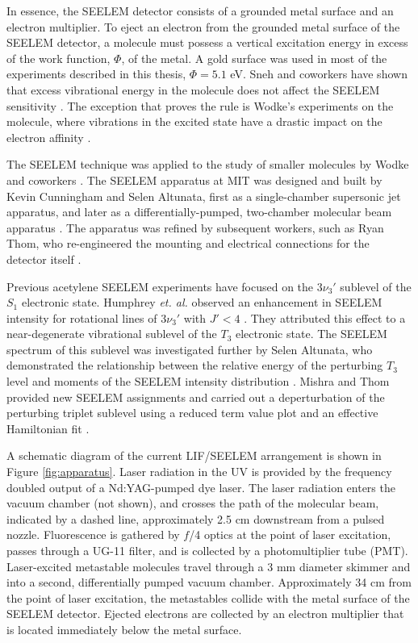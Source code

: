 In essence, the SEELEM detector consists of a grounded metal surface
and an electron multiplier.  To eject an electron from the grounded
metal surface of the SEELEM detector, a molecule must possess a
vertical excitation energy in excess of the work function, $\Phi$, of
the metal.  A gold surface was used in most of the experiments
described in this thesis, $\Phi = 5.1$ eV.  Sneh and coworkers have
shown that excess vibrational energy in the molecule does not affect
the SEELEM sensitivity \cite{sneh86}.  The exception that proves the
rule is Wodke's experiments on the  molecule, where vibrations
in the excited state have a drastic impact on the electron affinity
\cite{white05}.

The SEELEM technique was applied to the study of smaller molecules by
Wodke and coworkers \cite{price92, drabbels95, morgan96, humphrey97}.
The SEELEM apparatus at MIT was designed and built by Kevin Cunningham
and Selen Altunata, first as a single-chamber supersonic jet
apparatus, and later as a differentially-pumped, two-chamber molecular
beam apparatus \cite{cunningham-thesis, altunata-thesis}.  The
apparatus was refined by subsequent workers, such as Ryan Thom, who
re-engineered the mounting and electrical connections for the detector
itself \cite{thom-thesis}.

Previous acetylene SEELEM experiments have focused on the $3\nu_3'$
 sublevel of the $S_1$ electronic state.  Humphrey \emph{et.
  al.} observed an enhancement in SEELEM intensity for rotational
lines of $3\nu_3'$  with $J' < 4$ \cite{humphrey97}.  They
attributed this effect to a near-degenerate vibrational sublevel of
the $T_3$ electronic state.  The SEELEM spectrum of this sublevel was
investigated further by Selen Altunata, who demonstrated the
relationship between the relative energy of the perturbing $T_3$ level
and moments of the SEELEM intensity distribution \cite{altunata00}.
Mishra and Thom provided new SEELEM assignments and carried out a
deperturbation of the perturbing triplet sublevel using a reduced term
value plot and an effective Hamiltonian fit \cite{mishra04}.

A schematic diagram of the current LIF/SEELEM arrangement is shown in
Figure \ref{fig:apparatus}.  Laser radiation in the UV is provided by
the frequency doubled output of a Nd:YAG-pumped dye laser.  The laser
radiation enters the vacuum chamber (not shown), and crosses the path
of the molecular beam, indicated by a dashed line, approximately 2.5
cm downstream from a pulsed nozzle.  Fluorescence is gathered by $f$/4
optics at the point of laser excitation, passes through a UG-11
filter, and is collected by a photomultiplier tube (PMT).
Laser-excited metastable molecules travel through a 3 mm diameter
skimmer and into a second, differentially pumped vacuum chamber.
Approximately 34 cm from the point of laser excitation, the
metastables collide with the metal surface of the SEELEM detector.
Ejected electrons are collected by an electron multiplier that is
located immediately below the metal surface.

